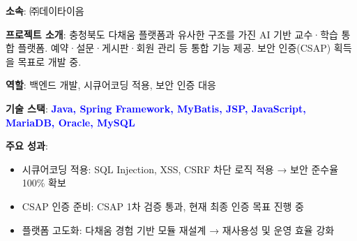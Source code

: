 \documentclass[a4paper,11pt]{article}
\newcommand{\tech}[1]{\textbf{\textcolor{blue}{#1}}}
\begin{document}
\textbf{소속}: ㈜데이타이음

\textbf{프로젝트 소개}:  
충청북도 다채움 플랫폼과 유사한 구조를 가진 AI 기반 교수·학습 통합 플랫폼.  
예약·설문·게시판·회원 관리 등 통합 기능 제공.  
보안 인증(CSAP) 획득을 목표로 개발 중.

\textbf{역할}: 백엔드 개발, 시큐어코딩 적용, 보안 인증 대응 

\textbf{기술 스택}: \tech{Java, Spring Framework, MyBatis, JSP, JavaScript, MariaDB, Oracle, MySQL}

\textbf{주요 성과}:
\begin{itemize}[leftmargin=*]
  \item 시큐어코딩 적용: SQL Injection, XSS, CSRF 차단 로직 적용 → 보안 준수율 100\% 확보
  \item CSAP 인증 준비: CSAP 1차 검증 통과, 현재 최종 인증 목표 진행 중
  \item 플랫폼 고도화: 다채움 경험 기반 모듈 재설계 → 재사용성 및 운영 효율 강화
\end{itemize}
\end{document}
